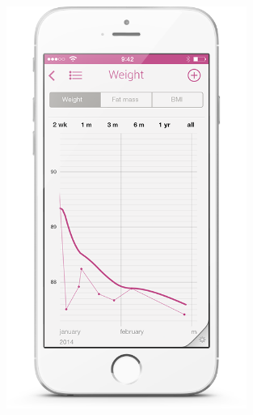 \documentclass[hyperref={pdfpagelabels=true}]{beamer}
\begin{document}
\begin{frame}
\begin{columns}
\begin{column}{0.3\textwidth}
\begin{figure}
	\includegraphics[width=0.7\textwidth]{app.png}\\
       \end{figure}  
  \end{column}  
\end{columns}
\end{frame}

\end{document}
